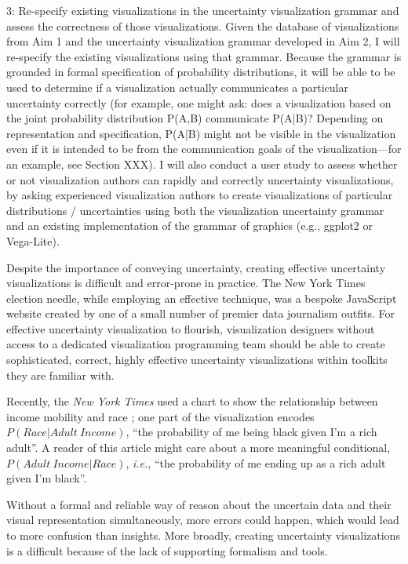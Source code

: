 \documentclass[11pt]{article}
\begin{document}
3: Re-specify existing visualizations in the uncertainty visualization grammar and assess the correctness of those visualizations. Given the database of visualizations from Aim 1 and the uncertainty visualization grammar developed in Aim 2, I will re-specify the existing visualizations using that grammar. Because the grammar is grounded in formal specification of probability distributions, it will be able to be used to determine if a visualization actually communicates a particular uncertainty correctly (for example, one might ask: does a visualization based on the joint probability distribution P(A,B) communicate P(A|B)? Depending on representation and specification, P(A|B) might not be visible in the visualization even if it is intended to be from the communication goals of the visualization---for an example, see Section XXX). I will also conduct a user study to assess whether or not visualization authors can rapidly and correctly uncertainty visualizations, by asking experienced visualization authors to create visualizations of particular distributions / uncertainties using both the visualization uncertainty grammar and an existing implementation of the grammar of graphics (e.g., ggplot2 or Vega-Lite).

Despite the importance of conveying uncertainty, creating effective uncertainty visualizations is difficult and error-prone in practice. The New York Times election needle, while employing an effective technique, was a bespoke JavaScript website created by one of a small number of premier data journalism outfits. For effective uncertainty visualization to flourish, visualization designers without access to a dedicated visualization programming team should be able to create sophisticated, correct, highly effective uncertainty visualizations within toolkits they are familiar with.



Recently, the \textit{New York Times} used a chart to show the relationship between income mobility and race \cite{emily_badger_income_2018}; one part of the visualization encodes $P(Race \vert Adult\ Income)$, ``the probability of me being black given I'm a rich adult''. A reader of this article might care about a more meaningful conditional, $P({Adult\ Income \vert Race })$, \textit{i.e.}, ``the probability of me ending up as a rich adult given I'm black''. 


Without a formal and reliable way of reason about the uncertain data and their visual representation simultaneously, more errors could happen, which would lead to more confusion than insights. More broadly, creating uncertainty visualizations is a difficult because of the lack of supporting formalism and tools. 
\end{document}
